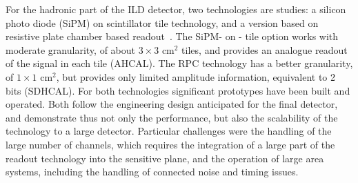 \documentclass[%
 amsmath,amssymb,
 aps,
]{revtex4-1}
\begin{document}
For the hadronic part of the ILD detector, two technologies are studies: a silicon photo diode (SiPM) on scintillator tile technology\cite{Simon:2010mi}, and a version based on resistive plate chamber based readout~\cite{Laktineh:2010zsa}. The SiPM- on - tile option works with moderate granularity, of about $3 \times 3$ cm$^2$ tiles, and provides an analogue readout of the signal in each tile (AHCAL). The RPC technology has a better granularity, of $1 \times 1$ cm$^2$, but provides only limited amplitude information, equivalent to 2 bits (SDHCAL). For both technologies significant prototypes have been built and operated. Both follow the engineering design anticipated for the final detector, and demonstrate thus not only the performance, but also the scalability of the technology to a large detector. Particular challenges were the handling of the large number of channels, which requires the integration of a large part of the readout technology into the sensitive plane, and the operation of large area systems, including the handling of connected noise and timing issues. 
\end{document}
